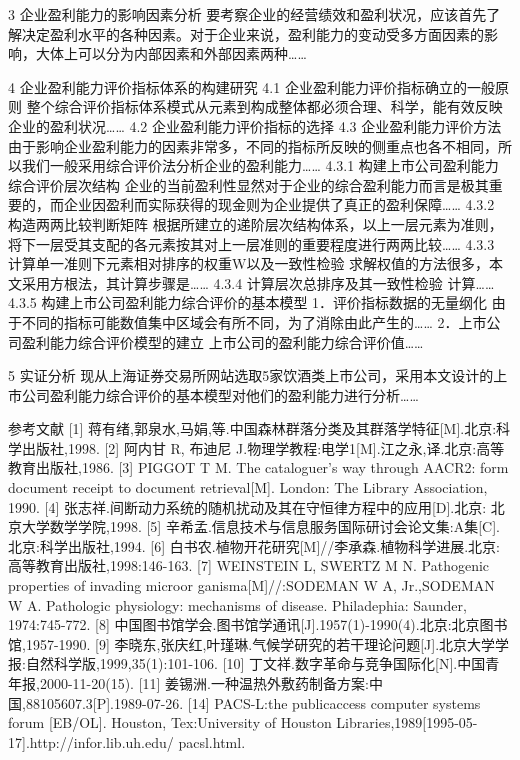 \documentclass{ctexart}
\begin{document}
3  企业盈利能力的影响因素分析
要考察企业的经营绩效和盈利状况，应该首先了解决定盈利水平的各种因素。对于企业来说，盈利能力的变动受多方面因素的影响，大体上可以分为内部因素和外部因素两种……

4  企业盈利能力评价指标体系的构建研究
4.1  企业盈利能力评价指标确立的一般原则
整个综合评价指标体系模式从元素到构成整体都必须合理、科学，能有效反映企业的盈利状况……
4.2  企业盈利能力评价指标的选择
4.3  企业盈利能力评价方法
由于影响企业盈利能力的因素非常多，不同的指标所反映的侧重点也各不相同，所以我们一般采用综合评价法分析企业的盈利能力……
4.3.1  构建上市公司盈利能力综合评价层次结构
企业的当前盈利性显然对于企业的综合盈利能力而言是极其重要的，而企业因盈利而实际获得的现金则为企业提供了真正的盈利保障……
4.3.2  构造两两比较判断矩阵
根据所建立的递阶层次结构体系，以上一层元素为准则，将下一层受其支配的各元素按其对上一层准则的重要程度进行两两比较……
4.3.3  计算单一准则下元素相对排序的权重W以及一致性检验
求解权值的方法很多，本文采用方根法，其计算步骤是……
4.3.4  计算层次总排序及其一致性检验
计算……
4.3.5  构建上市公司盈利能力综合评价的基本模型
1．评价指标数据的无量纲化
由于不同的指标可能数值集中区域会有所不同，为了消除由此产生的……
2．上市公司盈利能力综合评价模型的建立
上市公司的盈利能力综合评价值……

5  实证分析
现从上海证券交易所网站选取5家饮酒类上市公司，采用本文设计的上市公司盈利能力综合评价的基本模型对他们的盈利能力进行分析……


参考文献
[1] 蒋有绪,郭泉水,马娟,等.中国森林群落分类及其群落学特征[M].北京:科学出版社,1998.
[2] 阿内甘 R, 布迪尼 J.物理学教程:电学1[M].江之永,译.北京:高等教育出版社,1986.
[3] PIGGOT T M. The cataloguer’s way through AACR2: form document receipt to document retrieval[M]. London: The Library Association, 1990.
[4] 张志祥.间断动力系统的随机扰动及其在守恒律方程中的应用[D].北京: 北京大学数学学院,1998.
[5] 辛希孟.信息技术与信息服务国际研讨会论文集:A集[C].北京:科学出版社,1994.
[6] 白书农.植物开花研究[M]//李承森.植物科学进展.北京:高等教育出版社,1998:146-163.
[7] WEINSTEIN L, SWERTZ M N. Pathogenic properties of invading microor ganisma[M]//:SODEMAN W A, Jr.,SODEMAN W A. Pathologic physiology: mechanisms of disease. Philadephia: Saunder, 1974:745-772.
[8] 中国图书馆学会.图书馆学通讯[J].1957(1)-1990(4).北京:北京图书馆,1957-1990.
[9] 李晓东,张庆红,叶瑾琳.气候学研究的若干理论问题[J].北京大学学报:自然科学版,1999,35(1):101-106.
[10] 丁文祥.数字革命与竞争国际化[N].中国青年报,2000-11-20(15).
[11] 姜锡洲.一种温热外敷药制备方案:中国,88105607.3[P].1989-07-26.
[14] PACS-L:the publicaccess computer systems forum [EB/OL]. Houston, Tex:University of Houston Libraries,1989[1995-05-17].http://infor.lib.uh.edu/ pacsl.html.
\end{document}
